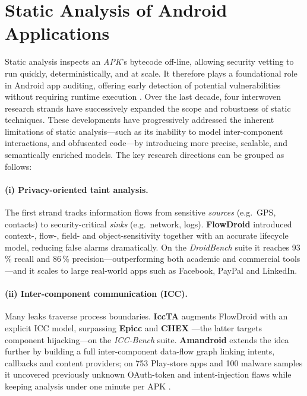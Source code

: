 \documentclass[a4paper,12pt]{report}
\begin{document}
\section{Static Analysis of Android Applications}
\label{sec:rw:static}

Static analysis inspects an \emph{APK}'s bytecode off-line, allowing security vetting to run quickly, deterministically, and at scale. It therefore plays a foundational role in Android app auditing, offering early detection of potential vulnerabilities without requiring runtime execution \cite{arzt2014flowdroid}.  Over the last decade, four interwoven research strands have successively expanded the scope and robustness of static techniques. These developments have progressively addressed the inherent limitations of static analysis—such as its inability to model inter-component interactions, and obfuscated code—by introducing more precise, scalable, and semantically enriched models. The key research directions can be grouped as follows:

\paragraph{(i) Privacy-oriented taint analysis.}
The first strand tracks information flows from sensitive \emph{sources} (e.g.\ GPS, contacts) to security-critical \emph{sinks} (e.g.\ network, logs).  \textbf{FlowDroid} introduced context-, flow-, field- and object-sensitivity together with an accurate lifecycle model, reducing false alarms dramatically.  On the \emph{DroidBench} suite it reaches 93\,\% recall and 86\,\% precision—outperforming both academic and commercial tools \cite{arzt2014flowdroid}—and it scales to large real-world apps such as Facebook, PayPal and LinkedIn.

\paragraph{(ii) Inter-component communication (ICC).}
Many leaks traverse process boundaries.  \textbf{IccTA} augments FlowDroid with an explicit ICC model, surpassing \textbf{Epicc} \cite{octeau2013epicc} and \textbf{CHEX} \cite{lu2012chex}—the latter targets component hijacking—on the \emph{ICC-Bench} suite.  \textbf{Amandroid} extends the idea further by building a full inter-component data-flow graph linking intents, callbacks and content providers; on 753 Play-store apps and 100 malware samples it uncovered previously unknown OAuth-token and intent-injection flaws while keeping analysis under one minute per APK \cite{wei2014amandroid}.
\end{document}
